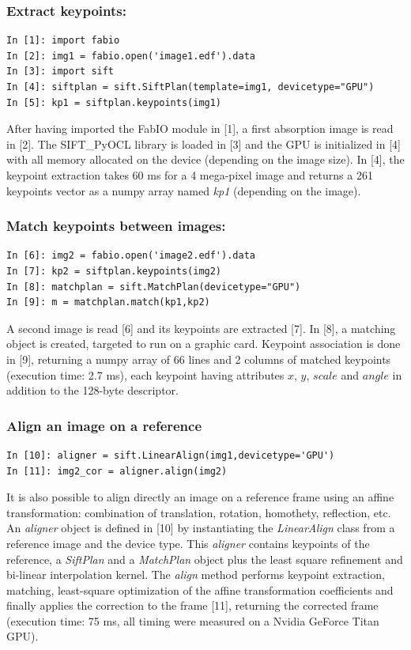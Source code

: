\documentclass[preprint]{iucr}
\begin{document}
\subsubsection{Extract keypoints:}
\begin{verbatim}
In [1]: import fabio
In [2]: img1 = fabio.open('image1.edf').data
In [3]: import sift
In [4]: siftplan = sift.SiftPlan(template=img1, devicetype="GPU")
In [5]: kp1 = siftplan.keypoints(img1)
\end{verbatim}

After having imported the FabIO \cite{fabio} module in [1], a first
absorption image is read in [2]. The SIFT\_PyOCL library is loaded in [3] and the
GPU is initialized in [4] with all memory allocated on the device (depending on
the image size).
In [4], the keypoint extraction takes 60 ms for a
4 mega-pixel image and returns a 261 keypoints vector as a numpy array named
\emph{kp1} (depending on the image).

\subsubsection{Match keypoints between images:}
\begin{verbatim}
In [6]: img2 = fabio.open('image2.edf').data
In [7]: kp2 = siftplan.keypoints(img2)
In [8]: matchplan = sift.MatchPlan(devicetype="GPU")
In [9]: m = matchplan.match(kp1,kp2)
\end{verbatim}
A second image is read [6] and its keypoints are extracted [7].
In [8], a matching object is created, targeted to run on a graphic card.
Keypoint association is done in [9], returning a numpy array of 66 lines and 2
columns of matched keypoints (execution time: 2.7 ms), each keypoint having
attributes $x$, $y$, $scale$ and $angle$ in addition to the 128-byte descriptor.

\subsubsection{Align an image on a reference}
\begin{verbatim}
In [10]: aligner = sift.LinearAlign(img1,devicetype='GPU')
In [11]: img2_cor = aligner.align(img2)
\end{verbatim}
It is also possible to align directly an image on a reference frame using an
affine transformation: combination of translation, rotation, homothety,
reflection, etc.
An \emph{aligner} object is defined in [10] by instantiating the
\emph{LinearAlign} class from a reference image and the device type.
This \emph{aligner} contains keypoints of the
reference, a \emph{SiftPlan} and a \emph{MatchPlan} object plus the least square
refinement and bi-linear interpolation kernel.
The \emph{align} method performs keypoint extraction, matching, least-square
optimization of the affine transformation coefficients and finally applies the
correction to the frame [11], returning the corrected frame (execution time:
75 ms, all timing were measured on a Nvidia GeForce Titan GPU).
\end{document}
